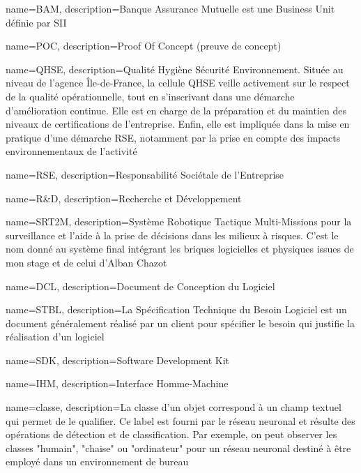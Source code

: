 {
  name={BAM},
    description={Banque Assurance Mutuelle est une Business Unit définie par SII}
}

{
  name={POC},
    description={Proof Of Concept (preuve de concept)}
}

{
  name={QHSE},
    description={Qualité Hygiène Sécurité Environnement. Située au niveau de l'agence \^{I}le-de-France, la cellule QHSE veille activement sur le respect de la qualité opérationnelle, tout en s'inscrivant dans une démarche d'amélioration continue. 
    Elle est en charge de la préparation et du maintien des niveaux de certifications de l'entreprise.
    Enfin, elle est impliquée dans la mise en pratique d'une démarche \gls{RSE}, notamment par la prise en compte des impacts environnementaux de l'activité}
}

{
  name={RSE},
    description={Responsabilité Sociétale de l'Entreprise}
}

{
  name={R\&D},
    description={Recherche et Développement}
}

{
  name={SRT2M},
    description={Système Robotique Tactique Multi-Missions pour la surveillance et l'aide à la prise de décisions dans les milieux à risques. 
    C'est le nom donné au système final intégrant les briques logicielles et physiques issues de mon stage et de celui d'Alban Chazot}
}

{
  name={DCL},
    description={Document de Conception du Logiciel}
}

{
  name={STBL},
    description={La Spécification Technique du Besoin Logiciel est un document généralement réalisé par un client pour spécifier le besoin qui justifie la réalisation d'un logiciel}
}

{
  name={SDK},
    description={Software Development Kit}
}

{
  name={IHM},
    description={Interface Homme-Machine}
}

{
  name={classe},
    description={La classe d'un objet correspond à un champ textuel qui permet de le qualifier. Ce label est fourni par le réseau neuronal et résulte des opérations de détection et de classification.
    Par exemple, on peut observer les classes "humain", "chaise" ou "ordinateur" pour un réseau neuronal destiné à être employé dans un environnement de bureau}
}

